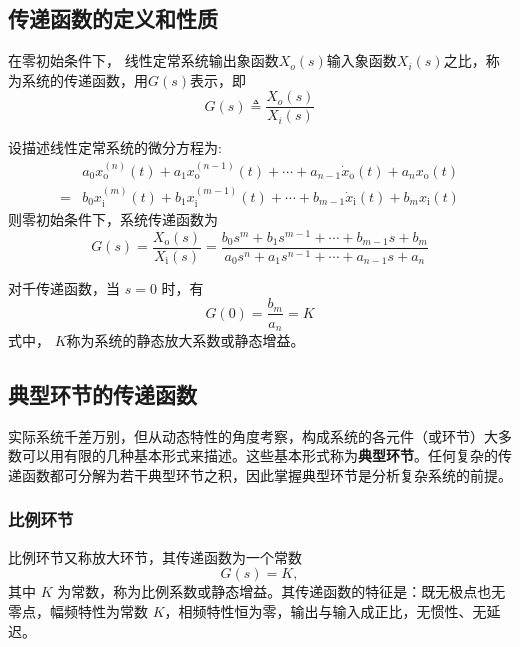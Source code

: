 \subsection{传递函数的定义和性质}
\begin{definition}[传递函数]
    在零初始条件下， 线性定常系统输出象函数$X_{o}(s)$输入象函数$X_{i}(s)$之比，称为系统的传递函数，用$G(s)$表示，即
    \begin{equation}
        G(s) \triangleq \frac{X_{o}(s)}{X_{i}(s)}
    \end{equation}
\end{definition}
设描述线性定常系统的微分方程为:
\begin{equation}
  \begin{aligned}
& a_{0} x_{\mathrm{o}}^{(n)}(t)+a_{1} x_{\mathrm{o}}^{(n-1)}(t)+\cdots+a_{n-1} \dot{x}_{\mathrm{o}}(t)+a_{n} x_{\mathrm{o}}(t) \\
= & b_{0} x_{\mathrm{i}}^{(m)}(t)+b_{1} x_{\mathrm{i}}^{(m-1)}(t)+\cdots+b_{m-1} \dot{x}_{\mathrm{i}}(t)+b_{m} x_{\mathrm{i}}(t)
\end{aligned}
\end{equation}
则零初始条件下，系统传递函数为
\begin{equation}
  G(s)=\frac{X_{\mathrm{o}}(s)}{X_{\mathrm{i}}(s)}=\frac{b_{0} s^{m}+b_{1} s^{m-1}+\cdots+b_{m-1} s+b_{m}}{a_{0} s^{n}+a_{1} s^{n-1}+\cdots+a_{n-1} s+a_{n}}
\end{equation}

\begin{definition}
    对千传递函数，当 $s=0$ 时，有
    $$G(0)=\frac{b_{m}}{a_{n}}=K$$
    式中， $K$称为系统的静态放大系数或静态增益。
\end{definition}


\subsection{典型环节的传递函数}

实际系统千差万别，但从动态特性的角度考察，构成系统的各元件（或环节）大多数可以用有限的几种基本形式来描述。这些基本形式称为\textbf{典型环节}。任何复杂的传递函数都可分解为若干典型环节之积，因此掌握典型环节是分析复杂系统的前提。

\subsubsection{比例环节}

\begin{definition}[比例环节]
    比例环节又称放大环节，其传递函数为一个常数
    \begin{equation}
        G(s)=K,
        \label{eq:比例环节传递函数}
    \end{equation}
    其中 $K$ 为常数，称为比例系数或静态增益。其传递函数的特征是：既无极点也无零点，幅频特性为常数 $K$，相频特性恒为零，输出与输入成正比，无惯性、无延迟。
\end{definition}

